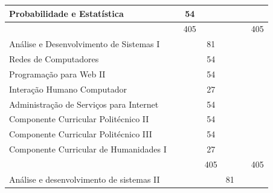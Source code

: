 \documentclass[11pt,fleqn]{book} %
\begin{document}
\begin{table}[]
{\begin{tabular}{@{}|l|c|c|c|c|c|c|@{}}
			Probabilidade e Estatística                                   &                      & 54                   &                      &                      &                      &             \\ \midrule
			&                      & 405                  &                      &                      &                      & 405         \\ \midrule
			Análise e Desenvolvimento de Sistemas I                       &                      &                      & 81                   &                      &                      &             \\ \midrule
			Redes de Computadores                                         &                      &                      & 54                   &                      &                      &             \\ \midrule
			Programação para Web II                                       &                      &                      & 54                   &                      &                      &             \\ \midrule
			Interação Humano Computador                                   &                      &                      & 27                   &                      &                      &             \\ \midrule
			Administração de Serviços para Internet                       &                      &                      & 54                   &                      &                      &             \\ \midrule
			Componente Curricular Politécnico II                          &                      &                      & 54                   &                      &                      &             \\ \midrule
			Componente Curricular Politécnico III                         &                      &                      & 54                   &                      &                      &             \\ \midrule
			Componente Curricular de Humanidades I                        &                      &                      & 27                   &                      &                      &             \\ \midrule
			&                      &                      & 405                  &                      &                      & 405         \\ \midrule
			Análise e desenvolvimento de sistemas II                      &                      &                      &                      & 81                   &                      &             \\ \midrule

\end{tabular}}
\end{table}
\end{document}
